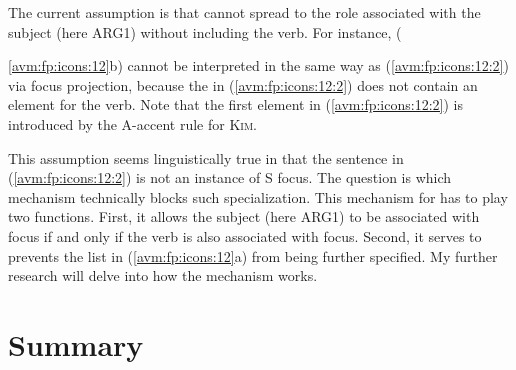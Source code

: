 The current assumption is that  cannot spread to the role
associated with the subject (here ARG1) without including the
verb. For instance, ({\ref{avm:fp:icons:12}b)
  cannot be interpreted in the same way as (\ref{avm:fp:icons:12:2})
  via focus projection, because the  in
  (\ref{avm:fp:icons:12:2}) does not contain an element for the
  verb. Note that the first  element in
  (\ref{avm:fp:icons:12:2}) is introduced by the A-accent rule for
  \textsc{Kim}.




This assumption seems linguistically true in that the sentence in
(\ref{avm:fp:icons:12:2}) is not an instance of S focus. The question
is which mechanism technically blocks such specialization. This
mechanism for  has to play two functions. First, it
allows the subject (here ARG1) to be associated with focus if and only
if the verb is also associated with focus. Second, it serves to
prevents the  list in (\ref{avm:fp:icons:12}a) from being further
specified.  My further research will delve into how the mechanism
works.



\section{Summary}
\label{10-4:sec:sum}

}
